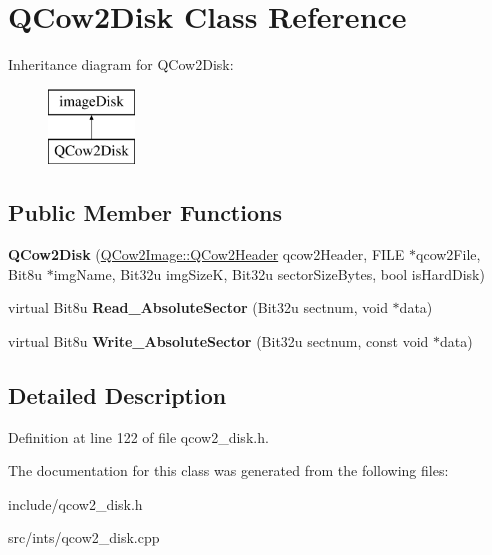 \hypertarget{classQCow2Disk}{\section{Q\-Cow2\-Disk Class Reference}
\label{classQCow2Disk}
}
Inheritance diagram for Q\-Cow2\-Disk\-:\begin{figure}[H]
\begin{center}
\leavevmode
\includegraphics[height=2.000000cm]{classQCow2Disk}
\end{center}
\end{figure}
\subsection*{Public Member Functions}
\begin{DoxyCompactItemize}
\item 
\hypertarget{classQCow2Disk_ab5c7ce6db2758362d56c1ee4d9823003}{{\bfseries Q\-Cow2\-Disk} (\hyperlink{structQCow2Image_1_1QCow2Header}{Q\-Cow2\-Image\-::\-Q\-Cow2\-Header} qcow2\-Header, F\-I\-L\-E $\ast$qcow2\-File, Bit8u $\ast$img\-Name, Bit32u img\-Size\-K, Bit32u sector\-Size\-Bytes, bool is\-Hard\-Disk)}\label{classQCow2Disk_ab5c7ce6db2758362d56c1ee4d9823003}

\item 
\hypertarget{classQCow2Disk_add204620c64ed072d1325c5ea074af69}{virtual Bit8u {\bfseries Read\-\_\-\-Absolute\-Sector} (Bit32u sectnum, void $\ast$data)}\label{classQCow2Disk_add204620c64ed072d1325c5ea074af69}

\item 
\hypertarget{classQCow2Disk_a80e67fbee4b7d429907ad43bc1f54fa5}{virtual Bit8u {\bfseries Write\-\_\-\-Absolute\-Sector} (Bit32u sectnum, const void $\ast$data)}\label{classQCow2Disk_a80e67fbee4b7d429907ad43bc1f54fa5}

\end{DoxyCompactItemize}


\subsection{Detailed Description}


Definition at line 122 of file qcow2\-\_\-disk.\-h.



The documentation for this class was generated from the following files\-:\begin{DoxyCompactItemize}
\item 
include/qcow2\-\_\-disk.\-h\item 
src/ints/qcow2\-\_\-disk.\-cpp\end{DoxyCompactItemize}
